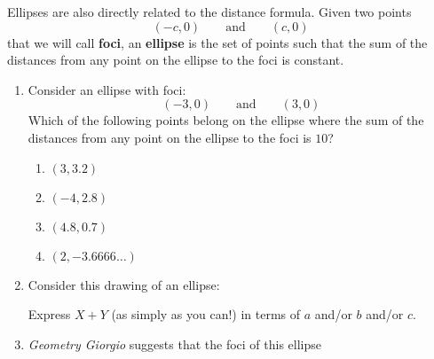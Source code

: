 \documentclass[nooutcomes,noauthor,handout]{ximera}
\begin{document}
\begin{question}
  Ellipses are also directly related to the distance formula.  Given
  two points
  \[
  (-c,0) \qquad\text{and} \qquad (c,0)
  \]
  that we will call \textbf{foci}, an \textbf{ellipse} is the set
  of points such that the sum of the distances from any point on
  the ellipse to the foci is constant.
  \begin{enumerate}      
  \item Consider an ellipse with foci:
    \[
    (-3,0) \qquad \text{and}\qquad (3,0)
    \]%
    Which of the following points belong on the ellipse where the sum
    of the distances from any point on the ellipse to the foci is
    $10$?
    \begin{enumerate}
    \item $(3,3.2)$
    \item $(-4,2.8)$
    \item $(4.8,0.7)$
    \item $(2,-3.6666\dots)$
    \end{enumerate}
    \item Consider this drawing of an ellipse:
      \begin{center}
      \end{center}
      Express $X+Y$ (as simply as you can!) in terms of $a$ and/or $b$
      and/or $c$.
    \item \textit{Geometry Giorgio} suggests that the foci of this ellipse
      \begin{center}
\end{center}
\end{enumerate}
\end{question}
\end{document}
